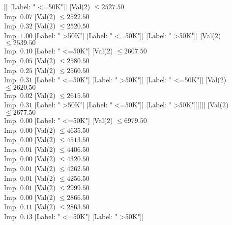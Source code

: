 \documentclass[margin=10pt]{standalone}
\begin{document}
\begin{forest}
																			[Label: " <=50K"]
																			[Label: " >50K"]]]
																	[Label: " <=50K"]]
																[Val($2$) $ \leq 2527.50$ \\ Imp. $0.07$
																	[Val($2$) $ \leq 2522.50$ \\ Imp. $0.32$
																		[Val($2$) $ \leq 2520.50$ \\ Imp. $1.00$
																			[Label: " >50K"]
																			[Label: " <=50K"]]
																		[Label: " >50K"]]
																	[Val($2$) $ \leq 2539.50$ \\ Imp. $0.10$
																		[Label: " <=50K"]
																		[Val($2$) $ \leq 2607.50$ \\ Imp. $0.05$
																			[Val($2$) $ \leq 2580.50$ \\ Imp. $0.25$
																				[Val($2$) $ \leq 2560.50$ \\ Imp. $0.31$
																					[Label: " <=50K"]
																					[Label: " >50K"]]
																				[Label: " <=50K"]]
																			[Val($2$) $ \leq 2620.50$ \\ Imp. $0.02$
																				[Val($2$) $ \leq 2615.50$ \\ Imp. $0.31$
																					[Label: " >50K"]
																					[Label: " <=50K"]]
																				[Label: " >50K"]]]]]]
															[Val($2$) $ \leq 2677.50$ \\ Imp. $0.00$
																[Label: " <=50K"]
																[Val($2$) $ \leq 6979.50$ \\ Imp. $0.00$
																	[Val($2$) $ \leq 4635.50$ \\ Imp. $0.00$
																		[Val($2$) $ \leq 4513.50$ \\ Imp. $0.01$
																			[Val($2$) $ \leq 4406.50$ \\ Imp. $0.00$
																				[Val($2$) $ \leq 4320.50$ \\ Imp. $0.01$
																					[Val($2$) $ \leq 4262.50$ \\ Imp. $0.01$
																						[Val($2$) $ \leq 4256.50$ \\ Imp. $0.01$
																							[Val($2$) $ \leq 2999.50$ \\ Imp. $0.00$
																								[Val($2$) $ \leq 2866.50$ \\ Imp. $0.11$
																									[Val($2$) $ \leq 2863.50$ \\ Imp. $0.13$
																										[Label: " <=50K"]
																										[Label: " >50K"]]

\end{forest}
\end{document}
